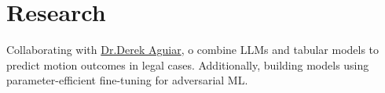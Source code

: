 \documentclass[]{resume-template}
\begin{document}
\begin{minipage}[t]{0.66\textwidth}

  \section{Research}\label{sec:research}
  \textbullet{} Collaborating with \href{https://www.derekaguiar.com/}{Dr.Derek Aguiar}, o combine LLMs and tabular models to predict motion outcomes in legal cases. Additionally, building models using parameter-efficient fine-tuning for adversarial ML.



\end{minipage}
\end{document}
